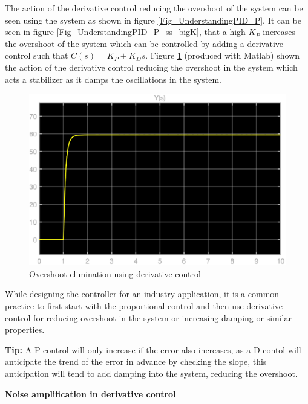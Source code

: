 The action of the derivative control reducing the overshoot of the system can be seen using the system as shown in figure \ref{Fig_UnderstandingPID_P}. It can be seen in figure \ref{Fig_UnderstandingPID_P_ss_bigK}, that a high $K_P$ increases the overshoot of the system which can be controlled by adding a derivative control such that $C(s) = K_P + K_D s$. Figure \ref{Fig_OvershootReduction_DerivativeControl} (produced with Matlab) shown the action of the derivative control reducing the overshoot in the system which acts a stabilizer as it damps the oscillations in the system.
\begin{figure}[h!]
	\centering
	\includegraphics[width=\linewidth]{Bilder/UnderstandingPID_D_Overshoot.eps}
	\caption{Overshoot elimination using derivative control}
	\label{Fig_OvershootReduction_DerivativeControl}
\end{figure}
While designing the controller for an industry application, it is a common practice to first start with the proportional control and then use derivative control for reducing overshoot in the system or increasing damping or similar properties.

\textbf{Tip: }A P control will only increase if the error also increases, as a D contol will anticipate the trend of the error in advance by checking the slope, this anticipation will tend to add damping into the system, reducing the overshoot.

\textbf{Noise amplification in derivative control}


